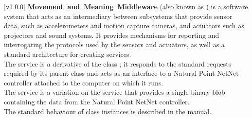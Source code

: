 [v1.0.0]
\textbf{Movement~and~Meaning~Middleware} (also known as \mplusm) is a software system
that acts as an intermediary between subsystems that provide sensor data, such as
accelerometers and motion capture cameras, and actuators such as projectors and sound
systems.
It provides mechanisms for reporting and interrogating the protocols used by the sensors
and actuators, as well as a standard architecture for creating services.\\

The \NNI{} service is a derivative of the \mplusm{} class ;
it responds to the standard requests required by its parent class and acts as an interface
to a Natural Point NetNet controller attached to the computer on which it runs.\\

The \NNBI{} service is a variation on the \NNI{} service that provides a single binary
blob containing the data from the Natural Point NetNet controller.\\

The standard behaviour of  class instances is described in
the \emph{\MMM} manual.
\primaryEnd{}
